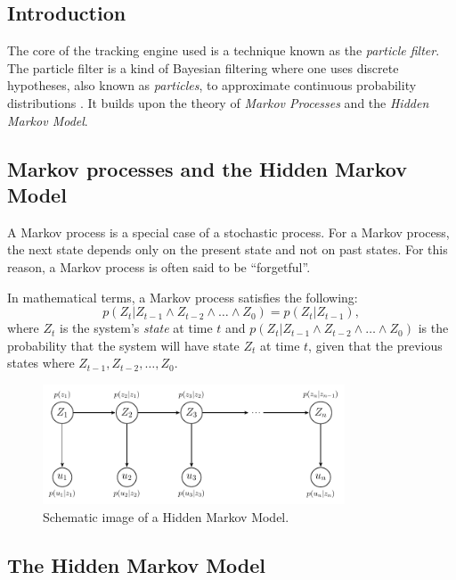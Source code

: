 \subsection{Introduction}
The core of the tracking engine used is a technique known as the \emph{particle filter}. The particle filter is a kind of Bayesian filtering where one uses discrete hypotheses, also known as \emph{particles}, to approximate continuous probability distributions \cite{ProbRob}. It builds upon the theory of \emph{Markov Processes} and the \emph{Hidden Markov Model}.

\subsection{Markov processes and the Hidden Markov Model}
A Markov process is a special case of a stochastic process. For a Markov process, the next state depends only on the present state and not on past states. For this reason, a Markov process is often said to be ``forgetful''.

In mathematical terms, a Markov process satisfies the following:
\begin{equation}
 p\left(Z_t|Z_{t-1} \wedge Z_{t-2} \wedge \dots \wedge Z_0\right) = p\left(Z_t|Z_{t-1}\right),
\end{equation}
where $Z_t$ is the system's \emph{state} at time $t$ and $p\left(Z_t|Z_{t-1} \wedge Z_{t-2} \wedge \dots \wedge Z_0\right)$ is the probability that the system will have state $Z_t$ at time $t$, given that the previous states where $Z_{t-1}, Z_{t-2},\dots, Z_0$.


\begin{figure}
  \centering
  \includegraphics[width=0.8\textwidth]{hmm-graph.pdf}
  \caption{Schematic image of a Hidden Markov Model.}
  \label{fig:hmm-graph}
\end{figure}

\subsection{The Hidden Markov Model}

